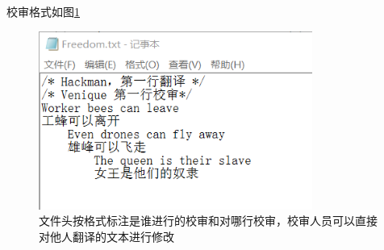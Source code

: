 \documentclass[10pt,a4paper,UTF8]{article}
\begin{document}
        校审格式如图\ref{fig:correct}
        \begin{figure}[!htbp]
            \centering
            \includegraphics[width=0.8\textwidth]{correct.png}
            \caption{文件头按格式标注是谁进行的校审和对哪行校审，校审人员可以直接对他人翻译的文本进行修改}
            \label{fig:correct}
        \end{figure}
\end{document}
